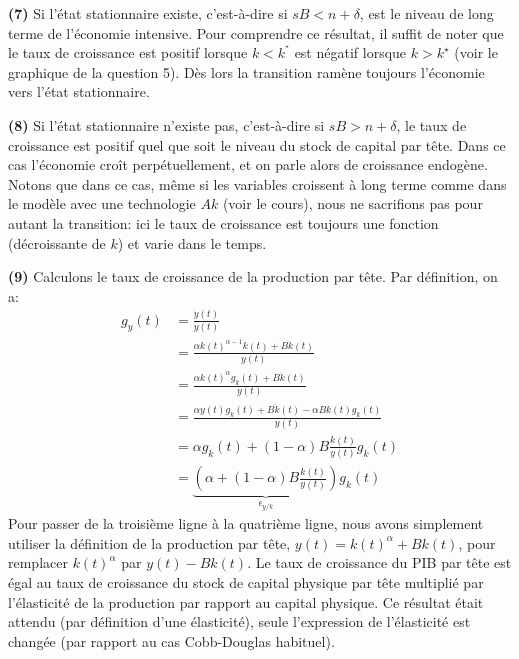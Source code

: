 \documentclass[10pt,a4paper,notitlepage]{article}
\newcommand{\question}[1]{\textbf{(#1)}}
\begin{document}
\question{7} Si l'état stationnaire existe, c'est-à-dire si
$sB<n+\delta$, est le niveau de long terme de l'économie
intensive. Pour comprendre ce résultat, il suffit de noter que le
taux de croissance est positif lorsque $k<k^{^{\star}}$ est négatif
lorsque $k>k^{\star}$ (voir le graphique de la question 5). Dès lors
la transition ramène toujours l'économie vers l'état
stationnaire.\newline

\question{8} Si l'état stationnaire n'existe pas, c'est-à-dire si
$sB>n+\delta$, le taux de croissance est positif quel que soit le
niveau du stock de capital par tête. Dans ce cas l'économie croît
perpétuellement, et on parle alors de croissance endogène. Notons que
dans ce cas, même si les variables croissent à long terme comme dans
le modèle avec une technologie $Ak$ (voir le cours), nous ne
sacrifions pas pour autant la transition: ici le taux de croissance
est toujours une fonction (décroissante de $k$) et varie dans le temps.\newline

\question{9} Calculons le taux de croissance de la production par
tête. Par définition, on a:
\[
\begin{split}
  g_y(t) &= \frac{\dot y(t)}{y(t)}\\
  &= \frac{\alpha k(t)^{\alpha-1}\dot k(t)+B\dot k(t)}{y(t)}\\
  &= \frac{\alpha k(t)^{\alpha} g_k(t) + B\dot k(t)}{y(t)}\\
  &= \frac{\alpha y(t) g_k(t) + B\dot k(t) - \alpha B k(t)g_k(t)}{y(t)}\\
  &= \alpha g_k(t) + (1-\alpha)B\frac{k(t)}{y(t)}g_k(t)\\
  &= \underset{\epsilon_{y/k}}{\underbrace{\left(\alpha + (1-\alpha)B\frac{k(t)}{y(t)}\right)}}g_k(t)
\end{split}
\]
Pour passer de la troisième ligne à la quatrième ligne, nous avons simplement utiliser la définition de la production par tête, $y(t)=k(t)^{\alpha}+Bk(t)$, pour remplacer $k(t)^{\alpha}$ par $y(t)-Bk(t)$.
Le taux de croissance du PIB par tête est égal au taux de croissance
du stock de capital physique par tête multiplié par l'élasticité de la
production par rapport au capital physique. Ce résultat était attendu
(par définition d'une élasticité), seule l'expression de l'élasticité
est changée (par rapport au cas Cobb-Douglas habituel).\newline
\end{document}
